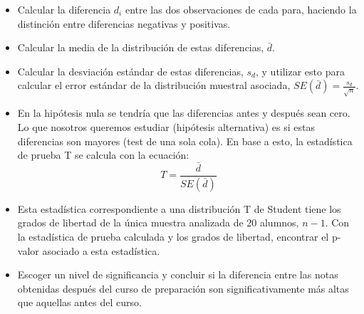 \documentclass{article}
\begin{document}
\begin{enumerate}
\begin{itemize}
\item Calcular la diferencia $d_i$ entre las dos observaciones de cada para, haciendo la distinción entre diferencias negativas y positivas.
\item Calcular la media de la distribución de estas diferencias, $\bar{d}$.
\item Calcular la desviación estándar de estas diferencias, $s_d$, y utilizar esto para calcular el error estándar de la distribución muestral asociada, $SE(\bar{d}) = \frac{s_d}{\sqrt{n}}$.
\item En la hipótesis nula se tendría que las diferencias antes y después sean cero. Lo que nosotros queremos estudiar (hipótesis alternativa) es si estas diferencias son mayores (test de una sola cola). En base a esto, la estadística de prueba T se calcula con la ecuación:
\begin{equation*}
T = \frac{\bar{d}}{SE(\bar{d})}
\end{equation*}
\item Esta estadística correspondiente a una distribución T de Student tiene los grados de libertad de la única muestra analizada de 20 alumnos, $n-1$. Con la estadística de prueba calculada y los grados de libertad, encontrar el p-valor asociado a esta estadística.
\item Escoger un nivel de significancia y concluir si la diferencia entre las notas obtenidas después del curso de preparación son significativamente más altas que aquellas antes del curso.

\end{itemize}


\end{enumerate}
\end{document}
